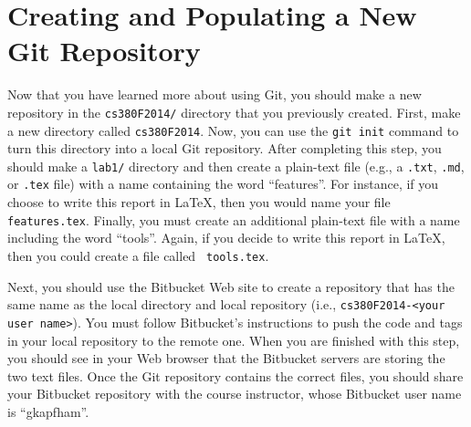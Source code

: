 \begin{enumerate}

\end{enumerate}

\section*{Creating and Populating a New Git Repository}

Now that you have learned more about using Git, you should make a new repository in the {\tt cs380F2014/} directory that
you previously created.  First, make a new directory called {\tt cs380F2014}. Now, you can use the
{\tt git init} command to turn this directory into a local Git repository.  After completing this step, you should
make a {\tt lab1/} directory and then create a plain-text file (e.g., a {\tt .txt}, {\tt .md}, or {\tt .tex} file) with
a name containing the word ``features''.  For instance, if you choose to write this report in \LaTeX, then you would
name your file {\tt features.tex}. Finally, you must create an additional plain-text file with a name including the word
``tools''.  Again, if you decide to write this report in \LaTeX, then you could create a file called {\tt
  tools.tex}. 

Next, you should use the Bitbucket Web site to create a repository that has the same name as the local directory and
local repository (i.e., {\tt cs380F2014-<your user name>}).  You must follow Bitbucket's instructions to push the code
and tags in your local repository to the remote one. When you are finished with this step, you should see in your Web
browser that the Bitbucket servers are storing the two text files. Once the Git repository contains the correct files,
you should share your Bitbucket repository with the course instructor, whose Bitbucket user name is ``gkapfham''.


